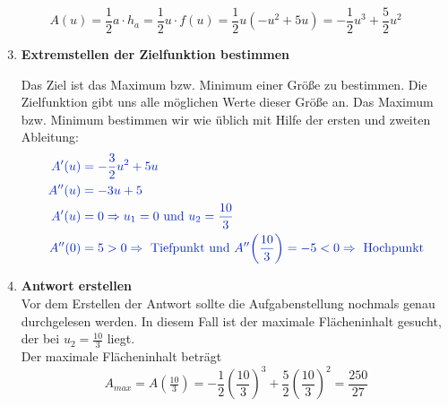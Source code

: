 \textcolor{loes}{\[A(u)=\frac{1}{2}a\cdot h_a=\frac{1}{2}u\cdot f(u)=\frac{1}{2}u\left(-u^2+5u\right)=-\frac{1}{2}u^3+\frac{5}{2}u^2\]}
\begin{enumerate}
	\setcounter{enumi}{2}
	\item \textbf{Extremstellen der Zielfunktion bestimmen}

	\textcolor{loes}{Das Ziel ist das Maximum bzw. Minimum einer Größe zu bestimmen. Die Zielfunktion gibt uns alle möglichen Werte dieser Größe an. Das Maximum bzw. Minimum bestimmen wir wie üblich mit Hilfe der ersten und zweiten Ableitung:}
    \begin{align*}
	   \textcolor{loes}{A'(u)}&\textcolor{loes}{\;=-\frac{3}{2}u^2+5u}\\
	   \textcolor{loes}{A''(u)}&\textcolor{loes}{\;=-3u+5}\\
	   \textcolor{loes}{A'(u)}&\textcolor{loes}{\;=0\Rightarrow u_1=0\text{ und }u_2=\frac{10}{3}}\\
	   \textcolor{loes}{A''(0)}&\textcolor{loes}{\;=5>0\Rightarrow\text{ Tiefpunkt und }A''\left(\frac{10}{3}\right)=-5<0\Rightarrow\text{ Hochpunkt}}
    \end{align*}

	\item \textbf{Antwort erstellen}\\
	\textcolor{loes}{Vor dem Erstellen der Antwort sollte die Aufgabenstellung nochmals genau durchgelesen werden. In diesem Fall ist der maximale Flächeninhalt gesucht, der bei \(u_2=\frac{10}{3}\) liegt.}\\
	\textcolor{loes}{Der maximale Flächeninhalt beträgt}\\
	\textcolor{loes}{\[A_{max}=A\left(\tfrac{10}{3}\right)=-\frac{1}{2}\left(\frac{10}{3}\right)^3+\frac{5}{2}\left(\frac{10}{3}\right)^2=\frac{250}{27}\]}
\end{enumerate}


